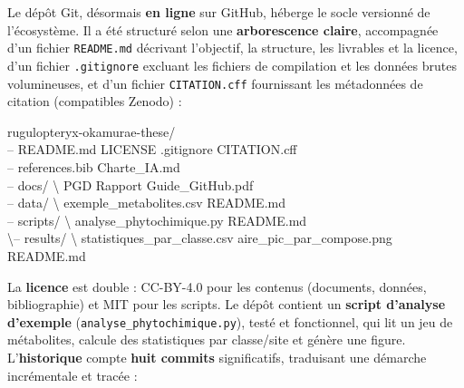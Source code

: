 \documentclass[11pt,a4paper]{article}
\begin{document}
Le dépôt Git, désormais \textbf{en ligne} sur GitHub, héberge le socle versionné de
l'écosystème. Il a été structuré selon une \textbf{arborescence claire}, accompagnée
d'un fichier \texttt{README.md} décrivant l'objectif, la structure, les livrables et
la licence, d'un fichier \texttt{.gitignore} excluant les fichiers de compilation et
les données brutes volumineuses, et d'un fichier \texttt{CITATION.cff} fournissant les
métadonnées de citation (compatibles Zenodo) :

\begin{center}
\begin{minipage}{0.94\linewidth}
\small\ttfamily
rugulopteryx-okamurae-these/\\
\quad\textbar-- README.md \;\textperiodcentered\; LICENSE \;\textperiodcentered\; .gitignore \;\textperiodcentered\; CITATION.cff\\
\quad\textbar-- references.bib \;\textperiodcentered\; Charte\_IA.md\\
\quad\textbar-- docs/ \;\textbackslash\; PGD \;\textperiodcentered\; Rapport \;\textperiodcentered\; Guide\_GitHub.pdf\\
\quad\textbar-- data/ \;\textbackslash\; exemple\_metabolites.csv \;\textperiodcentered\; README.md\\
\quad\textbar-- scripts/ \;\textbackslash\; analyse\_phytochimique.py \;\textperiodcentered\; README.md\\
\quad\textbackslash-- results/ \;\textbackslash\; statistiques\_par\_classe.csv \;\textperiodcentered\; aire\_pic\_par\_compose.png \;\textperiodcentered\; README.md
\end{minipage}
\end{center}

La \textbf{licence} est double : CC-BY-4.0 pour les contenus (documents, données,
bibliographie) et MIT pour les scripts. Le dépôt contient un \textbf{script
d'analyse d'exemple} (\texttt{analyse\_phytochimique.py}), testé et fonctionnel, qui
lit un jeu de métabolites, calcule des statistiques par classe/site et génère une
figure. L'\textbf{historique} compte \textbf{huit commits} significatifs, traduisant
une démarche incrémentale et tracée :
\end{document}
